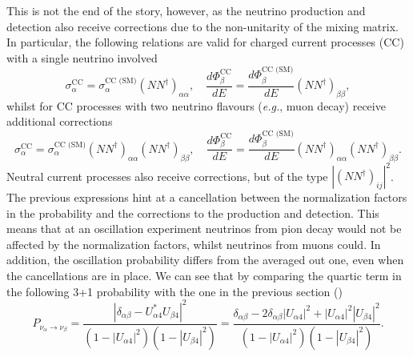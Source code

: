 This is not the end of the story, however, as the neutrino production and detection also receive corrections due to the non-unitarity of the mixing matrix. In particular, the following relations are valid for charged current processes (CC) with a single neutrino involved
\begin{equation}
 \sigma_{\alpha}^{\text{CC}} =  \sigma_{\alpha}^{\text{CC (SM)}} (NN^{\dagger})_{\alpha \alpha}, \quad \frac{ d\Phi^{\text{CC}}_{\beta}}{dE} = \frac{ d\Phi^{\text{CC (SM)}}_{\beta}}{dE} (NN^{\dagger})_{\beta \beta},
\end{equation}
whilst for CC processes with two neutrino flavours (\textit{e.g.}, muon decay) receive additional corrections
\begin{equation}
 \sigma_{\alpha}^{\text{CC}} =  \sigma_{\alpha}^{\text{CC (SM)}} (NN^{\dagger})_{\alpha \alpha}(NN^{\dagger})_{\beta \beta}, \quad \frac{ d\Phi^{\text{CC}}_{\beta}}{dE} = \frac{ d\Phi^{\text{CC (SM)}}_{\beta}}{dE} (NN^{\dagger})_{\alpha \alpha} (NN^{\dagger})_{\beta \beta}.
\end{equation}
Neutral current processes also receive corrections, but of the type $|(NN^{\dagger})_{i j}|^2$. The previous expressions hint at a cancellation between the normalization factors in the probability and the corrections to the production and detection. This means that at an oscillation experiment neutrinos from pion decay would not be affected by the normalization factors, whilst neutrinos from muons could. In addition, the oscillation probability differs from the averaged out one, even when the cancellations are in place. We can see that by comparing the quartic term in the following 3+1 probability with the one in the previous section ()
\begin{equation}
 P_{\nu_{\alpha} \to \nu_{\beta}} = \frac{\left| \delta_{\alpha \beta} - U_{\alpha 4}^*U_{\beta 4} \right|^2}{(1-|U_{\alpha 4}|^2)(1-|U_{\beta 4}|^2)} %
 = \frac{ \delta_{\alpha \beta} - 2 \delta_{\alpha \beta} |U_{\alpha 4}|^2 + |U_{\alpha 4}|^2 |U_{\beta 4}|^2}{(1-|U_{\alpha 4}|^2)(1-|U_{\beta 4}|^2)}.
\end{equation}

